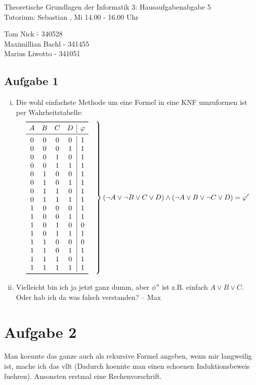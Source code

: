 \documentclass[a4paper,10pt]{article}
\begin{document}
\begin{center}
\Large{Theoretische Grundlagen der Informatik 3: Hausaufgabenabgabe 5} \\
\large{Tutorium: Sebastian , Mi 14.00 - 16.00 Uhr}
\end{center}
\begin{tabbing}
Tom Nick \hspace{2cm}\= - 340528\\
Maximillian Bachl \> - 341455 \\
Marius Liwotto\> -  341051
\end{tabbing}
\subsection*{Aufgabe 1}
\begin{enumerate}[(i)]
\item 	Die wohl einfachste Methode um eine Formel in eine KNF umzuformen ist per Wahrheitstabelle:
	\[
	\left.\begin{array}{cccc|c}
		\toprule 
		A & B & C & D & \varphi\\
		\midrule
		0 & 0 & 0 & 0 & 1\\
		0 & 0 & 0 & 1 & 1\\
		0 & 0 & 1 & 0 & 1\\
		0 & 0 & 1 & 1 & 1\\
		0 & 1 & 0 & 0 & 1\\
		0 & 1 & 0 & 1 & 1\\
		0 & 1 & 1 & 0 & 1\\
		0 & 1 & 1 & 1 & 1\\
		1 & 0 & 0 & 0 & 1\\
		1 & 0 & 0 & 1 & 1\\
		1 & 0 & 1 & 0 & 0\\
		1 & 0 & 1 & 1 & 1\\
		1 & 1 & 0 & 0 & 0\\
		1 & 1 & 0 & 1 & 1\\
		1 & 1 & 1 & 0 & 1\\
		1 & 1 & 1 & 1 & 1\\
		\bottomrule
		\end{array} \quad \right\} ( \lnot A \lor  \lnot B \lor C \lor D) \land (\lnot A \lor B \lor \lnot C \lor D) = \varphi'
	 \]
\item
	Vielleicht bin ich ja jetzt ganz dumm, aber $\phi''$ ist z.B. einfach $A \lor B \lor C$. Oder hab ich da was falsch verstanden? -- Max
 \end{enumerate}
\section*{Aufgabe 2}
	Man koennte das ganze auch als rekursive Formel angeben, wenn mir langweilig ist, 		mache ich das vllt (Dadurch koennte man einen schoenen Induktionsbeweis fuehren). 
	Ansonsten erstmal eine Rechenvorschrift.
\end{document}
